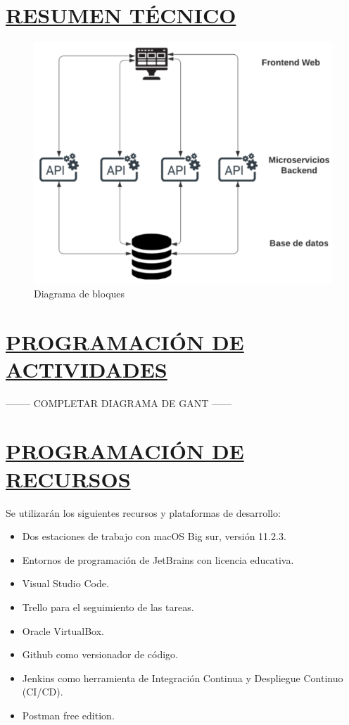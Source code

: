 \section*{\underline{RESUMEN TÉCNICO}}
\begin{figure}[H]
	\centering
	\includegraphics[width=\textwidth]{imagenes/resumen_tecnico.png} 
	\caption{Diagrama de bloques}
\end{figure}

\section*{\underline{PROGRAMACIÓN DE ACTIVIDADES}}
-------- COMPLETAR DIAGRAMA DE GANT ------

\section*{\underline{PROGRAMACIÓN DE RECURSOS}}
Se utilizarán los siguientes recursos y plataformas de desarrollo:
\begin{itemize}
	\item Dos estaciones de trabajo con macOS Big sur, versión 11.2.3.
	\item Entornos de programación de JetBrains con licencia educativa.
	\item Visual Studio Code.
	\item Trello para el seguimiento de las tareas.
	\item Oracle VirtualBox.
	\item Github como versionador de código.
	\item Jenkins como herramienta de Integración Continua y Despliegue Continuo (CI/CD).
	\item Postman free edition.
\end{itemize}

